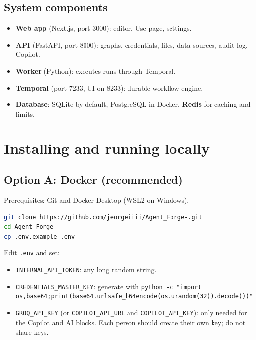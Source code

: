 \documentclass[11pt,a4paper]{article}
\begin{document}
\subsection{System components}

\begin{itemize}[nosep]
  \item \textbf{Web app} (Next.js, port 3000): editor, Use page, settings.
  \item \textbf{API} (FastAPI, port 8000): graphs, credentials, files, data sources, audit log, Copilot.
  \item \textbf{Worker} (Python): executes runs through Temporal.
  \item \textbf{Temporal} (port 7233, UI on 8233): durable workflow engine.
  \item \textbf{Database}: SQLite by default, PostgreSQL in Docker. \textbf{Redis} for caching and limits.
\end{itemize}

\section{Installing and running locally}

\subsection{Option A: Docker (recommended)}

Prerequisites: Git and Docker Desktop (WSL2 on Windows).

\begin{lstlisting}[language=bash]
git clone https://github.com/jeorgeiiii/Agent_Forge-.git
cd Agent_Forge-
cp .env.example .env
\end{lstlisting}

Edit \texttt{.env} and set:

\begin{itemize}[nosep]
  \item \texttt{INTERNAL\_API\_TOKEN}: any long random string.
  \item \texttt{CREDENTIALS\_MASTER\_KEY}: generate with
  \texttt{python -c "import os,base64;print(base64.urlsafe\_b64encode(os.urandom(32)).decode())"}
  \item \texttt{GROQ\_API\_KEY} (or \texttt{COPILOT\_API\_URL} and \texttt{COPILOT\_API\_KEY}): only needed for the Copilot and AI blocks. Each person should create their own key; do not share keys.
\end{itemize}
\end{document}

